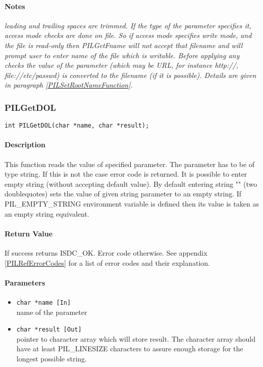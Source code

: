 \paragraph{Notes\\}
{\it
leading and trailing spaces are trimmed.
If the type of the parameter specifies it, access mode checks are done 
on file. So if access mode specifies write mode, and the file is read-only 
then PILGetFname will not accept that filename
and will prompt user to enter name of the file which is writable. 
Before applying any checks the value of the parameter (which may be URL, 
for instance http://, file://etc/passwd) is converted to the filename
(if it is possible). Details are given in paragraph \ref{PILSetRootNameFunction}.
}



\subsubsection{PILGetDOL}

\begin{verbatim}
int PILGetDOL(char *name, char *result); 
\end{verbatim}

\paragraph{Description\\}
This function reads the value of specified parameter. The parameter has to
be of type string. If this is not the case error code is returned. 
It is possible to enter empty string (without accepting default value).
By default entering string "" (two doublequotes) sets the value of given string
parameter to an empty string. If PIL\_EMPTY\_STRING environment variable
is defined then its value is taken as an empty string equivalent.

\paragraph{Return Value\\}
If success returns ISDC\_OK. Error code otherwise. See appendix \ref{PILRefErrorCodes}
for a list of error codes and their explanation.

\paragraph{Parameters}
\begin{itemize}
\item
{\tt char *name [In] } \\
name of the parameter
\item
{\tt char *result [Out] } \\
pointer to character array which will store result. The character array
should have at least PIL\_LINESIZE characters to assure enough storage for
the longest possible string.
\end{itemize}

